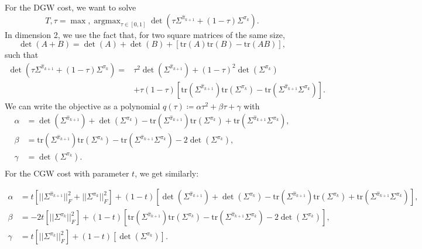 \documentclass{article}
\newcommand{\1}{\mathbf{1}}
\newcommand{\DGW}{\mathrm{DGW}}
\DeclareMathOperator*{\argmax}{argmax}
\theoremstyle{definition}
\theoremstyle{remark}
\begin{document}
\begin{appendices}
For the $\DGW$ cost, we want to solve \[T, \tau=\max,\argmax_{\tau\in[0,1]}\det(\tau\Sigma^{\hat{\pi}_{k+1}}+(1-\tau)\Sigma^{\pi_{k}}).\]
In dimension 2, we use the fact that, for two square matrices of the same size,
\begin{equation*}
        \det(A+B)= \det(A)+\det(B)+[\mathrm{tr}(A)\mathrm{tr}(B)-\mathrm{tr}(AB)],
\end{equation*}
such that
\begin{equation*}
    \begin{split}
        \det(\tau\Sigma^{\hat{\pi}_{k+1}}+(1-\tau)\Sigma^{\pi_{k}})=& \tau^2\det(\Sigma^{\hat{\pi}_{k+1}})
        +(1-\tau)^2\det(\Sigma^{\pi_{k}})\\&
        +\tau(1-\tau)[\mathrm{tr}(\Sigma^{\hat{\pi}_{k+1}})\mathrm{tr}(\Sigma^{\pi_{k}})-\mathrm{tr}(\Sigma^{\hat{\pi}_{k+1}}\Sigma^{\pi_{k}})].
    \end{split}
\end{equation*}
We can write the objective as a polynomial $q(\tau)\coloneqq\alpha\tau^2+\beta\tau+\gamma$ with
\begin{equation*}
    \begin{split}
        \alpha &=\det(\Sigma^{\hat{\pi}_{k+1}})+\det(\Sigma^{\pi_{k}})-\mathrm{tr}(\Sigma^{\hat{\pi}_{k+1}})\mathrm{tr}(\Sigma^{\pi_{k}})+\mathrm{tr}(\Sigma^{\hat{\pi}_{k+1}}\Sigma^{\pi_{k}}),\\
        \beta  &=\mathrm{tr}(\Sigma^{\hat{\pi}_{k+1}})\mathrm{tr}(\Sigma^{\pi_{k}})-\mathrm{tr}(\Sigma^{\hat{\pi}_{k+1}}\Sigma^{\pi_{k}})-2\det(\Sigma^{\pi_{k}}),\\
        \gamma &=\det(\Sigma^{\pi_{k}}).\\
    \end{split}
\end{equation*}
For the CGW cost with parameter $t$, we get similarly:

\begin{equation*}
    \begin{split}
        \alpha &=t[||\Sigma^{\hat{\pi}_{k+1}}||_F^2+||\Sigma^{\pi_{k}}||_F^2]+(1-t)[\det(\Sigma^{\hat{\pi}_{k+1}})+\det(\Sigma^{\pi_{k}})-\mathrm{tr}(\Sigma^{\hat{\pi}_{k+1}})\mathrm{tr}(\Sigma^{\pi_{k}})+\mathrm{tr}(\Sigma^{\hat{\pi}_{k+1}}\Sigma^{\pi_{k}})],\\
        \beta  &=-2t[||\Sigma^{\pi_{k}}||_F^2]+(1-t)[\mathrm{tr}(\Sigma^{\hat{\pi}_{k+1}})\mathrm{tr}(\Sigma^{\pi_{k}})-\mathrm{tr}(\Sigma^{\hat{\pi}_{k+1}}\Sigma^{\pi_{k}})-2\det(\Sigma^{\pi_{k}})],\\
        \gamma &=t[||\Sigma^{\pi_{k}}||_F^2]+(1-t)[\det(\Sigma^{\pi_{k}})].\\
    \end{split}
\end{equation*}


\end{appendices}
\end{document}
